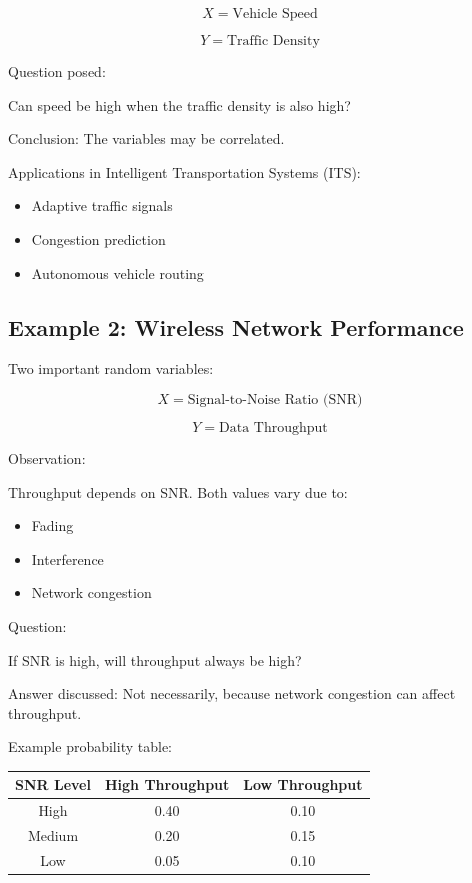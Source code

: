 \documentclass{article}
\begin{document}
\[
X = \text{Vehicle Speed}
\]

\[
Y = \text{Traffic Density}
\]

Question posed:

Can speed be high when the traffic density is also high?

Conclusion: The variables may be correlated.

Applications in Intelligent Transportation Systems (ITS):

\begin{itemize}
\item Adaptive traffic signals
\item Congestion prediction
\item Autonomous vehicle routing
\end{itemize}

\bigskip

\subsection*{Example 2: Wireless Network Performance}

Two important random variables:

\[
X = \text{Signal-to-Noise Ratio (SNR)}
\]

\[
Y = \text{Data Throughput}
\]

Observation:

Throughput depends on SNR. Both values vary due to:

\begin{itemize}
\item Fading
\item Interference
\item Network congestion
\end{itemize}

Question:

If SNR is high, will throughput always be high?

Answer discussed: Not necessarily, because network congestion can affect throughput.

Example probability table:

\bigskip

\begin{tabular}{|c|c|c|}
\hline
SNR Level & High Throughput & Low Throughput \\
\hline
High & 0.40 & 0.10 \\
\hline
Medium & 0.20 & 0.15 \\
\hline
Low & 0.05 & 0.10 \\
\hline
\end{tabular}
\end{document}
